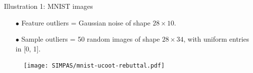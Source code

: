 \documentclass{beamer}
\begin{document}
\begin{frame}{Illustration 1: MNIST images}
\scriptsize
\begin{itemize}
  \item[$\bullet$] Feature outliers = Gaussian noise of shape $28 \times 10$.
  \item[$\bullet$] Sample outliers = 50 random images of shape $28 \times 34$, with uniform entries in [0, 1].
\end{itemize}
\vspace{-0.5cm}
\begin{figure}
    \centering
    \texttt{[image: SIMPAS/mnist-ucoot-rebuttal.pdf]}
    \vspace*{-1cm}
\end{figure}


\end{frame}
\end{document}
